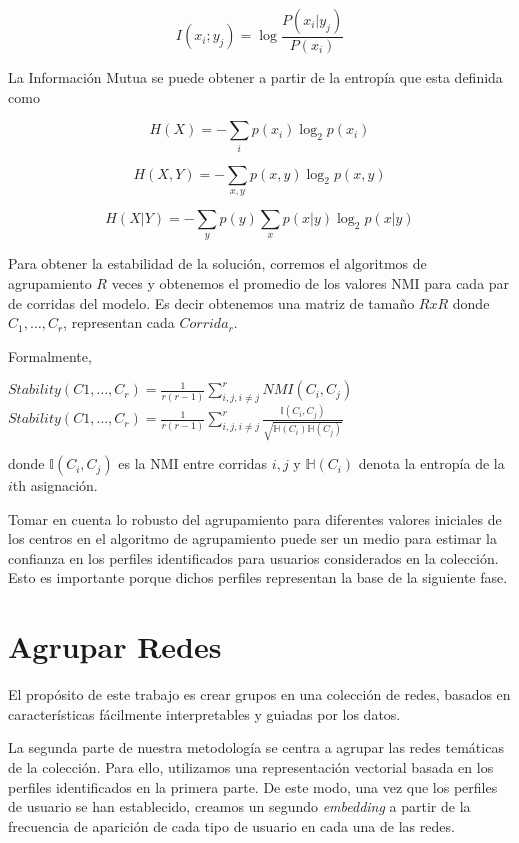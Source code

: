 $$ {\displaystyle I(x_{i};y_{j})=\log {\frac {P(x_{i}|y_{j})}{P(x_{i})}}} $$


La Información Mutua se puede obtener a partir de la entropía que esta definida como

$${\displaystyle H(X)=-\sum _{i}p(x_{i})\log _{2}p(x_{i})}$$

$${\displaystyle H(X,Y)=-\sum _{x,y}p(x,y)\log _{2}p(x,y)}$$

$${\displaystyle H(X|Y)=-\sum _{y}p(y)\sum _{x}p(x|y)\log _{2}p(x|y)}$$

Para obtener la estabilidad de la solución, corremos el algoritmos de agrupamiento $R$ veces y obtenemos el promedio de los valores NMI para cada par de corridas del modelo. Es decir obtenemos una matriz de tamaño $R x R$ donde $C_1,\ldots,C_r$, representan cada $Corrida_r$.

Formalmente, 

\begin{center}\label{eq:PNMI}
$Stability(C1,\ldots,C_r) = \frac{1}{r(r-1)}\sum_{i,j,i\not=j}^{r}NMI(C_i,C_j)$ \\
$Stability(C1,\ldots,C_r) = \frac{1}{r(r-1)}\sum_{i,j,i\not=j}^{r} \frac{\mathbb{I}(C_i,C_j)}{\sqrt{\mathbb{H}(C_i)\mathbb{H}(C_j)}}$
\end{center}

donde $\mathbb{I}(C_i,C_j)$ es la NMI entre corridas $i,j$ y $\mathbb{H}(C_i)$ denota la entropía de la $i$th asignación.

Tomar en cuenta lo robusto del agrupamiento para diferentes valores iniciales de los centros en el algoritmo de agrupamiento puede ser un medio para estimar la confianza en los perfiles identificados para usuarios considerados en la colección. Esto es importante porque dichos perfiles representan la base de la siguiente fase. 

\section{Agrupar Redes}
\label{sec:system:sec3}

El propósito de este trabajo es crear grupos en una colección de redes, basados en características fácilmente interpretables y guiadas por los datos. 

La segunda parte de nuestra metodología se centra a agrupar las redes temáticas de la colección. Para ello, utilizamos una representación vectorial basada en los perfiles identificados en la primera parte. De este modo, una vez que los perfiles de usuario se han establecido, creamos un segundo \textit{embedding} a partir de la frecuencia de aparición de cada tipo de usuario en cada una de las redes. 
 
